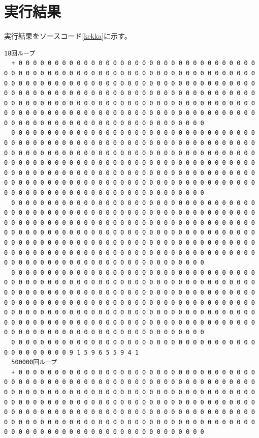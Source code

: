 \documentclass[a4j,dvipdfmx,titlepage]{jarticle}
\begin{document}
\section{実行結果}
実行結果をソースコード\ref{kekka}に示す。
\begin{lstlisting}[caption=実行結果,label=kekka]
  18回ループ
  + 0 0 0 0 0 0 0 0 0 0 0 0 0 0 0 0 0 0 0 0 0 0 0 0 0 0 0 0 0 0 0 0 0 0 0 0 0 0 0 0 0 0 0 0 0 0 0 0 0 0 0 0 0 0 0 0 0 0 0 0 0 0 0 0 0 0 0 0 0 0 0 0 0 0 0 0 0 0 0 0 0 0 0 0 0 0 0 0 0 0 0 0 0 0 0 0 0 0 0 0 0 0 0 0 0 0 0 0 0 0 0 0 0 0 0 0 0 0 0 0 0 0 0 0 0 0 0 0 0 0 0 0 0 0 0 0 0 0 0 0 0 0 0 0 0 0 0 0 0 0 0 0 0 0 0 0 0 0 0 0 0 0 0 0 0 0 0 0 0 0 0 0 0 0 0 0 0 0 0 0 0 0 0 0 0 0 0 0 0 0 0 0 0 0 0 0 0 0 0 0 0 0 0 0 0 0 0 0 0 0 0 0 0 0 0 0 0 0 0 0 0 0 0 0 0 0 0 0 0 0 0 0 0 0 0 0 
  0 0 0 0 0 0 0 0 0 0 0 0 0 0 0 0 0 0 0 0 0 0 0 0 0 0 0 0 0 0 0 0 0 0 0 0 0 0 0 0 0 0 0 0 0 0 0 0 0 0 0 0 0 0 0 0 0 0 0 0 0 0 0 0 0 0 0 0 0 0 0 0 0 0 0 0 0 0 0 0 0 0 0 0 0 0 0 0 0 0 0 0 0 0 0 0 0 0 0 0 0 0 0 0 0 0 0 0 0 0 0 0 0 0 0 0 0 0 0 0 0 0 0 0 0 0 0 0 0 0 0 0 0 0 0 0 0 0 0 0 0 0 0 0 0 0 0 0 0 0 0 0 0 0 0 0 0 0 0 0 0 0 0 0 0 0 0 0 0 0 0 0 0 0 0 0 0 0 0 0 0 0 0 0 0 0 0 0 0 0 0 0 0 0 0 0 0 0 0 0 0 0 0 0 0 0 0 0 0 0 0 0 0 0 0 0 0 0 0 0 0 0 0 0 0 0 0 0 0 0 0 0 0 0 0 0 0 
  0 0 0 0 0 0 0 0 0 0 0 0 0 0 0 0 0 0 0 0 0 0 0 0 0 0 0 0 0 0 0 0 0 0 0 0 0 0 0 0 0 0 0 0 0 0 0 0 0 0 0 0 0 0 0 0 0 0 0 0 0 0 0 0 0 0 0 0 0 0 0 0 0 0 0 0 0 0 0 0 0 0 0 0 0 0 0 0 0 0 0 0 0 0 0 0 0 0 0 0 0 0 0 0 0 0 0 0 0 0 0 0 0 0 0 0 0 0 0 0 0 0 0 0 0 0 0 0 0 0 0 0 0 0 0 0 0 0 0 0 0 0 0 0 0 0 0 0 0 0 0 0 0 0 0 0 0 0 0 0 0 0 0 0 0 0 0 0 0 0 0 0 0 0 0 0 0 0 0 0 0 0 0 0 0 0 0 0 0 0 0 0 0 0 0 0 0 0 0 0 0 0 0 0 0 0 0 0 0 0 0 0 0 0 0 0 0 0 0 0 0 0 0 0 0 0 0 0 0 0 0 0 0 0 0 0 0 
  0 0 0 0 0 0 0 0 0 0 0 0 0 0 0 0 0 0 0 0 0 0 0 0 0 0 0 0 0 0 0 0 0 0 0 0 0 0 0 0 0 0 0 0 0 0 0 0 0 0 0 0 0 0 0 0 0 0 0 0 0 0 0 0 0 0 0 0 0 0 0 0 0 0 0 0 0 0 0 0 0 0 0 0 0 0 0 0 0 0 0 0 0 0 0 0 0 0 0 0 0 0 0 0 0 0 0 0 0 0 0 0 0 0 0 0 0 0 0 0 0 0 0 0 0 0 0 0 0 0 0 0 0 0 0 0 0 0 0 0 0 0 0 0 0 0 0 0 0 0 0 0 0 0 0 0 0 0 0 0 0 0 0 0 0 0 0 0 0 0 0 0 0 0 0 0 0 0 0 0 0 0 0 0 0 0 0 0 0 0 0 0 0 0 0 0 0 0 0 0 0 0 0 0 0 0 0 0 0 0 0 0 0 0 0 0 0 0 0 0 0 0 0 0 0 0 0 0 0 0 0 0 0 0 0 0 0 
  0 0 0 0 0 0 0 0 0 0 0 0 0 0 0 0 0 0 0 0 0 0 0 0 0 0 0 0 0 0 0 0 0 0 0 0 0 0 0 0 0 0 0 9 1 5 9 6 5 5 9 4 1
  500000回ループ
  + 0 0 0 0 0 0 0 0 0 0 0 0 0 0 0 0 0 0 0 0 0 0 0 0 0 0 0 0 0 0 0 0 0 0 0 0 0 0 0 0 0 0 0 0 0 0 0 0 0 0 0 0 0 0 0 0 0 0 0 0 0 0 0 0 0 0 0 0 0 0 0 0 0 0 0 0 0 0 0 0 0 0 0 0 0 0 0 0 0 0 0 0 0 0 0 0 0 0 0 0 0 0 0 0 0 0 0 0 0 0 0 0 0 0 0 0 0 0 0 0 0 0 0 0 0 0 0 0 0 0 0 0 0 0 0 0 0 0 0 0 0 0 0 0 0 0 0 0 0 0 0 0 0 0 0 0 0 0 0 0 0 0 0 0 0 0 0 0 0 0 0 0 0 0 0 0 0 0 0 0 0 0 0 0 0 0 0 0 0 0 0 0 0 0 0 0 0 0 0 0 0 0 0 0 0 0 0 0 0 0 0 0 0 0 0 0 0 0 0 0 0 0 0 0 0 0 0 0 0 0 0 0 0 0 0 0 

\end{lstlisting}
\end{document}
